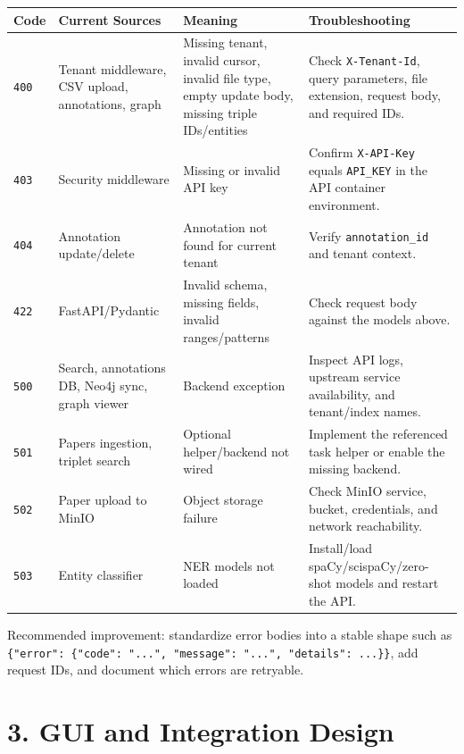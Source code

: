 \documentclass[10pt,letterpaper]{article}
\begin{document}
\begin{scriptsize}
\begin{longtable}{>{\raggedright\arraybackslash}p{1.68in}>{\raggedright\arraybackslash}p{1.68in}>{\raggedright\arraybackslash}p{1.68in}>{\raggedright\arraybackslash}p{1.68in}}
Code & Current Sources & Meaning & Troubleshooting \\
\hline
\texttt{400} & Tenant middleware, CSV upload, annotations, graph & Missing tenant, invalid cursor, invalid file type, empty update body, missing triple IDs/entities & Check \texttt{X-Tenant-Id}, query parameters, file extension, request body, and required IDs. \\
\texttt{403} & Security middleware & Missing or invalid API key & Confirm \texttt{X-API-Key} equals \texttt{API\_KEY} in the API container environment. \\
\texttt{404} & Annotation update/delete & Annotation not found for current tenant & Verify \texttt{annotation\_id} and tenant context. \\
\texttt{422} & FastAPI/Pydantic & Invalid schema, missing fields, invalid ranges/patterns & Check request body against the models above. \\
\texttt{500} & Search, annotations DB, Neo4j sync, graph viewer & Backend exception & Inspect API logs, upstream service availability, and tenant/index names. \\
\texttt{501} & Papers ingestion, triplet search & Optional helper/backend not wired & Implement the referenced task helper or enable the missing backend. \\
\texttt{502} & Paper upload to MinIO & Object storage failure & Check MinIO service, bucket, credentials, and network reachability. \\
\texttt{503} & Entity classifier & NER models not loaded & Install/load spaCy/scispaCy/zero-shot models and restart the API. \\
\end{longtable}
\end{scriptsize}

Recommended improvement: standardize error bodies into a stable shape such as \texttt{\{"error": \{"code": "...", "message": "...", "details": ...\}\}}, add request IDs, and document which errors are retryable.

\section{3. GUI and Integration Design}
\end{document}

